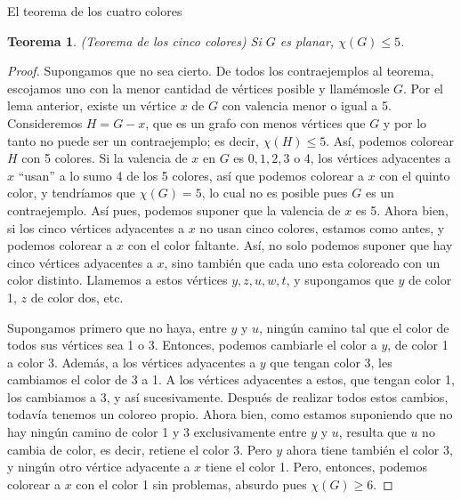 \documentclass[11pt,spanish,makeidx]{amsbook}
\newtheorem{teorema}{Teorema}[section]
\theoremstyle{definition}
\theoremstyle{remark}
\begin{document}
\begin{section}{El teorema de los cuatro colores}
\begin{teorema}\label{tA4.3.1}(Teorema de los cinco colores) Si $G$ es
planar, $\chi (G)\le 5$.
\end{teorema}
\begin{proof}
 Supongamos que no sea cierto. De todos los
contraejemplos al teorema, escojamos uno con la menor cantidad de
vértices posible y llamémosle $G$. Por el lema anterior, existe un
vértice $x$ de $G$ con valencia menor o igual a 5. Consideremos
$H=G-x$, que es un grafo con menos vértices que $G$ y por lo tanto
no puede ser un contraejemplo; es decir, $\chi (H)\le 5$. Así,
podemos colorear $H$ con 5 colores. Si la valencia de $x$ en $G$
es $0,1,2,3$ o 4, los vértices adyacentes a $x$ ``usan'' a lo sumo
4 de los 5 colores, así que podemos colorear a $x$ con el quinto
color, y tendríamos que $\chi (G)=5$, lo cual no es posible pues
$G$ es un contraejemplo. Así pues, podemos suponer que la valencia
de $x$ es 5. Ahora bien, si los cinco vértices adyacentes a $x$ no
usan cinco colores, estamos como antes, y podemos colorear a $x$
con el color faltante. Así, no solo podemos suponer que hay cinco
vértices adyacentes a $x$, sino también que cada uno esta
coloreado con un color distinto. Llamemos a estos vértices
$y,z,u,w,t$, y supongamos que $y$ de color 1, $z$ de color dos,
etc.

\begin{figure}[h]
\caption{}\label{fA4.11}
\end{figure}

Supongamos primero que no haya, entre $y$ y $u$, ningún camino tal
que el color de todos sus vértices sea 1 o 3. Entonces, podemos
cambiarle el color a $y$, de color 1 a color 3. Además, a los
vértices adyacentes a $y$ que tengan color 3, les cambiamos el
color de 3 a 1. A los vértices adyacentes a estos, que tengan
color 1, los cambiamos a 3, y así sucesivamente. Después de
realizar todos estos cambios, todavía tenemos un coloreo propio.
Ahora bien, como estamos suponiendo que no hay ningún camino de
color 1 y 3 exclusivamente entre $y$ y $u$, resulta que $u$ no
cambia de color, es decir, retiene el color 3. Pero $y$ ahora
tiene también el color 3, y ningún otro vértice adyacente a $x$
tiene el color 1. Pero, entonces, podemos colorear a $x$ con el
color 1 sin problemas, absurdo pues $\chi(G)\ge 6$.


\end{proof}
\end{section}
\end{document}
